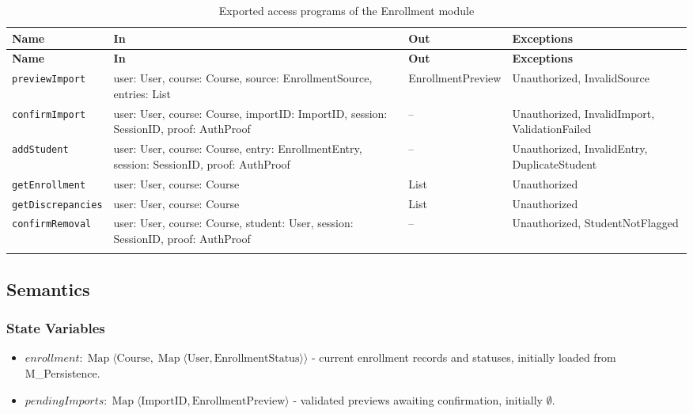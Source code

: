 \documentclass[12pt, titlepage]{article}
\begin{document}
\begingroup
\small
\setlength{\tabcolsep}{4pt}
\renewcommand{\arraystretch}{1.2}
\begin{longtable}{>{\raggedright\arraybackslash}p{}
                  >{\raggedright\arraybackslash}p{}
                  >{\raggedright\arraybackslash}p{}
                  >{\raggedright\arraybackslash}p{}}
\toprule
\textbf{Name} & \textbf{In} & \textbf{Out} & \textbf{Exceptions} \\
\midrule
\endfirsthead
\toprule
\textbf{Name} & \textbf{In} & \textbf{Out} & \textbf{Exceptions} \\
\midrule
\endhead
\endfoot
\texttt{previewImport} & user: User, course: Course, source: EnrollmentSource, entries: List & EnrollmentPreview & Unauthorized, InvalidSource \\
\texttt{confirmImport} & user: User, course: Course, importID: ImportID, session: SessionID, proof: AuthProof & -- & Unauthorized, InvalidImport, ValidationFailed \\
\texttt{addStudent} & user: User, course: Course, entry: EnrollmentEntry, session: SessionID, proof: AuthProof & -- & Unauthorized, InvalidEntry, DuplicateStudent \\
\texttt{getEnrollment} & user: User, course: Course & List & Unauthorized \\
\texttt{getDiscrepancies} & user: User, course: Course & List & Unauthorized \\
\texttt{confirmRemoval} & user: User, course: Course, student: User, session: SessionID, proof: AuthProof & -- & Unauthorized, StudentNotFlagged \\
\bottomrule
\caption{Exported access programs of the Enrollment module}
\label{TblEnrollmentAccessPrograms}
\end{longtable}
\endgroup

\subsection{Semantics}

\subsubsection{State Variables}

\begin{itemize}
    \item $\mathit{enrollment}:
    \operatorname{Map}\langle
    \text{Course},
    \operatorname{Map}\langle
    \text{User},\text{EnrollmentStatus}
    \rangle\rangle$
    - current enrollment records and statuses,
    initially loaded from M\_Persistence.

    \item $\mathit{pendingImports}:
    \operatorname{Map}\langle
    \text{ImportID},\text{EnrollmentPreview}\rangle$
    - validated previews awaiting confirmation,
    initially $\emptyset$.
\end{itemize}
\end{document}
